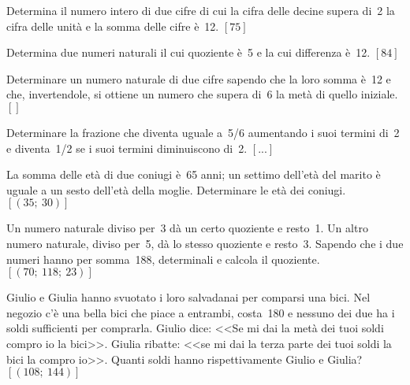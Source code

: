 \begin{htmulticols}{2}
\begin{esercizio}[*]
 \label{ese:22.84}
Determina il numero intero di due cifre di cui la cifra delle decine 
supera di~2 la cifra delle unità e la somma delle cifre è~12.
\hfill \(\left[75\right]\)
\end{esercizio}

\begin{esercizio}
 \label{ese:22.85}
Determina due numeri naturali il cui quoziente è~5 e la cui differenza 
è~12.
\hfill \(\left[84\right]\)
\end{esercizio}

\begin{esercizio}[*]
 \label{ese:22.86}
Determinare un numero naturale di due cifre sapendo che la loro somma
è~12 e che, invertendole, si ottiene un numero che supera di~6 la
metà di quello iniziale.
\hfill \(\left[\right]\)
\end{esercizio}

\begin{esercizio}
 \label{ese:22.87}
Determinare la frazione che diventa uguale a~5/6 aumentando i suoi
termini di~2 e diventa~1/2 se i suoi termini diminuiscono di~2.
\hfill \(\left[...\right]\)
\end{esercizio}

\begin{esercizio}[*]
 \label{ese:22.88}
La somma delle età di due coniugi è~65 anni; un settimo
dell'età del marito è uguale a un sesto
dell'età della moglie. Determinare le età dei
coniugi.
\hfill \(\left[(35;~30)\right]\)
\end{esercizio}

\begin{esercizio}[*]
 \label{ese:22.89}
Un numero naturale diviso per~3 dà un certo quoziente e resto~1. Un
altro numero naturale, diviso per~5, dà lo stesso quoziente e resto~3.
Sapendo che i due numeri hanno per somma~188, determinali e calcola
il quoziente.
\hfill \(\left[(70;~118;~23)\right]\)
\end{esercizio}

\begin{esercizio}[*]
 \label{ese:22.90}
Giulio e Giulia hanno svuotato i loro
salvadanai per comparsi una bici. Nel negozio c'è
una bella bici che piace a entrambi, costa{\officialeuro}~180 e nessuno 
dei due ha i soldi sufficienti per comprarla. Giulio dice:
<<Se mi dai la metà dei tuoi soldi compro io la bici>>. 
Giulia ribatte: 
<<se mi dai la terza parte dei tuoi soldi la bici la compro io>>. 
Quanti soldi hanno rispettivamente Giulio e Giulia?
\hfill \(\left[(108;~144)\right]\)
\end{esercizio}


\end{htmulticols}
